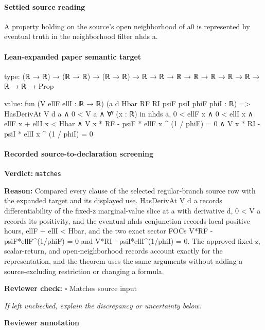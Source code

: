 \documentclass[10pt]{article}
\newcommand{\reviewerbox}{%
  \par\noindent\fbox{\parbox{0.96\linewidth}{\rule{0pt}{0.38in}}}\par
}
\newcommand{\reviewmatch}[1]{%
  \par\noindent\textbf{Reviewer check:} $\square$\; #1\par
  \noindent\emph{If left unchecked, explain the discrepancy or uncertainty below.}\par
}
\begin{document}
\paragraph{Settled source reading}
\begin{sloppypar}
A property holding on the source's open neighborhood of a0 is represented by eventual truth in the neighborhood filter nhds a.\allowbreak{}
\end{sloppypar}

\paragraph{Lean-expanded paper semantic target}
\begin{ReviewVerbatim}
type:
(ℝ → ℝ) → (ℝ → ℝ) → (ℝ → ℝ) → ℝ → ℝ → ℝ → ℝ → ℝ → ℝ → ℝ → ℝ → ℝ → Prop

value:
fun (V ellF ellI : ℝ → ℝ) (a d Hbar RF RI psiF psiI phiF phiI : ℝ) =>
  HasDerivAt V d a ∧
    0 < V a ∧
      ∀ᶠ (x : ℝ) in nhds a,
        0 < ellF x ∧
          0 < ellI x ∧
            ellF x + ellI x < Hbar ∧
              V x * RF - psiF * ellF x ^ (1 / phiF) = 0 ∧ V x * RI - psiI * ellI x ^ (1 / phiI) = 0
\end{ReviewVerbatim}


\paragraph{Recorded source-to-declaration screening}
\textbf{Verdict:} \texttt{matches}
\\
{\raggedright
\textbf{Reason:} Compared every clause of the selected regular-\allowbreak{}branch source row with the expanded target and its displayed use.\allowbreak{} HasDerivAt V d a records differentiability of the fixed-\allowbreak{}z marginal-\allowbreak{}value slice at a with derivative d, 0 < V a records its positivity, and the eventual nhds conjunction records local positive hours, ellF + ellI < Hbar, and the two exact sector FOCs V*RF -\allowbreak{} psiF*ellF\textasciicircum{}(1/\allowbreak{}phiF) = 0 and V*RI -\allowbreak{} psiI*ellI\textasciicircum{}(1/\allowbreak{}phiI) = 0.\allowbreak{} The approved fixed-\allowbreak{}z, scalar-\allowbreak{}return, and open-\allowbreak{}neighborhood records account exactly for the representation, and the theorem uses the same arguments without adding a source-\allowbreak{}excluding restriction or changing a formula.\allowbreak{}
\par}
\reviewmatch{Matches source input}
\noindent\textbf{Reviewer annotation}\par
\reviewerbox
\clearpage
\hypertarget{paper-prerequisite-552e4781bba8ea77}{}
\end{document}
